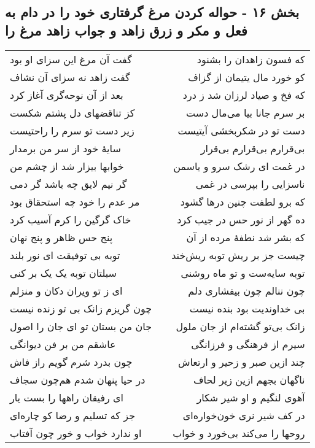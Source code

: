 \begin{center}
\section*{بخش ۱۶ - حواله کردن مرغ گرفتاری خود را در دام به فعل و مکر و زرق  زاهد و جواب زاهد مرغ را}
\label{sec:sh016}
\begin{longtable}{l p{0.5cm} r}
گفت آن مرغ این سزای او بود
&&
که فسون زاهدان را بشنود
\\
گفت زاهد نه سزای آن نشاف
&&
کو خورد مال یتیمان از گزاف
\\
بعد از آن نوحه‌گری آغاز کرد
&&
که فخ و صیاد لرزان شد ز درد
\\
کز تناقضهای دل پشتم شکست
&&
بر سرم جانا بیا می‌مال دست
\\
زیر دست تو سرم را راحتیست
&&
دست تو در شکربخشی آیتیست
\\
سایهٔ خود از سر من برمدار
&&
بی‌قرارم بی‌قرارم بی‌قرار
\\
خوابها بیزار شد از چشم من
&&
در غمت ای رشک سرو و یاسمن
\\
گر نیم لایق چه باشد گر دمی
&&
ناسزایی را بپرسی در غمی
\\
مر عدم را خود چه استحقاق بود
&&
که برو لطفت چنین درها گشود
\\
خاک گرگین را کرم آسیب کرد
&&
ده گهر از نور حس در جیب کرد
\\
پنج حس ظاهر و پنج نهان
&&
که بشر شد نطفهٔ مرده از آن
\\
توبه بی توفیقت ای نور بلند
&&
چیست جز بر ریش توبه ریش‌خند
\\
سبلتان توبه یک یک بر کنی
&&
توبه سایه‌ست و تو ماه روشنی
\\
ای ز تو ویران دکان و منزلم
&&
چون ننالم چون بیفشاری دلم
\\
چون گریزم زانک بی تو زنده نیست
&&
بی خداوندیت بود بنده نیست
\\
جان من بستان تو ای جان را اصول
&&
زانک بی‌تو گشته‌ام از جان ملول
\\
عاشقم من بر فن دیوانگی
&&
سیرم از فرهنگی و فرزانگی
\\
چون بدرد شرم گویم راز فاش
&&
چند ازین صبر و زحیر و ارتعاش
\\
در حیا پنهان شدم هم‌چون سجاف
&&
ناگهان بجهم ازین زیر لحاف
\\
ای رفیقان راهها را بست یار
&&
آهوی لنگیم و او شیر شکار
\\
جز که تسلیم و رضا کو چاره‌ای
&&
در کف شیر نری خون‌خواره‌ای
\\
او ندارد خواب و خور چون آفتاب
&&
روحها را می‌کند بی‌خورد و خواب

\end{longtable}
\end{center}
